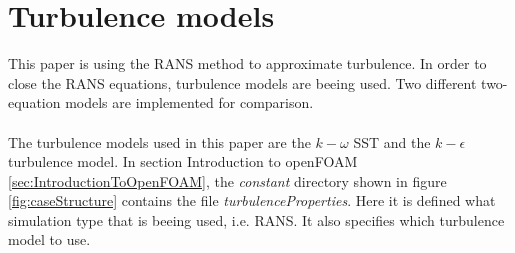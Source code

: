 \documentclass[a4paper, 12pt]{report}
\begin{document}
\section{Turbulence models}
This paper is using the RANS method to approximate turbulence. In order to close the RANS equations, turbulence models are beeing used. Two different two-equation models are implemented for comparison.\\
\\
The turbulence models used in this paper are the $k-\omega$ SST and the $k-\epsilon$ turbulence model. In section Introduction to openFOAM \ref{sec:IntroductionToOpenFOAM}, the \textit{constant} directory shown in figure \ref{fig:caseStructure} contains the file \textit{turbulenceProperties}. Here it is defined what simulation type that is beeing used, i.e. RANS. It also specifies which turbulence model to use.
\end{document}
